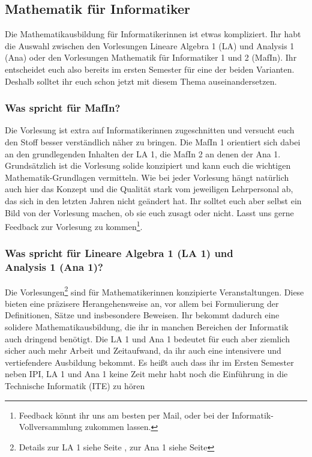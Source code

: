 \subsection{Mathematik für Informatiker}

Die Mathematikausbildung für Informatikerinnen ist etwas kompliziert. Ihr habt die Auswahl zwischen den Vorlesungen Lineare Algebra 1 (\gls{LA}) und Analysis 1 (\gls{Ana}) oder den Vorlesungen Mathematik für Informatiker 1 und 2 (\gls{MafIn}). Ihr entscheidet euch also bereits im ersten Semester für eine der beiden Varianten. Deshalb solltet ihr euch schon jetzt mit diesem Thema auseinandersetzen.

\subsubsection{Was spricht für MafIn?}
Die Vorlesung ist extra auf Informatikerinnen zugeschnitten und versucht euch den Stoff besser verständlich näher zu bringen. Die MafIn 1 orientiert sich dabei an den grundlegenden Inhalten der LA 1, die MafIn 2 an denen der Ana 1. Grundsätzlich ist die Vorlesung solide konzipiert und kann euch die wichtigen Mathematik-Grundlagen vermitteln. Wie bei jeder Vorlesung hängt natürlich auch hier das Konzept und die Qualität stark vom jeweiligen Lehrpersonal ab, das sich in den letzten Jahren nicht geändert hat. Ihr solltet euch aber selbst ein Bild von der Vorlesung machen, ob sie euch zusagt oder nicht. Lasst uns gerne Feedback zur Vorlesung zu kommen\footnote{Feedback könnt ihr uns am besten per Mail, oder bei der Informatik-Vollversammlung zukommen lassen.}.

\subsubsection{Was spricht für Lineare Algebra 1 (LA 1) und \\Analysis 1 (Ana 1)?}
Die Vorlesungen\footnote{Details zur LA 1 siehe Seite \pageref{la1}, zur Ana 1 siehe Seite \pageref{ana1}} sind für Mathematikerinnen konzipierte Veranstaltungen. Diese bieten eine präzisere Herangehensweise an, vor allem bei Formulierung der Definitionen, Sätze und insbesondere Beweisen. Ihr bekommt dadurch eine solidere Mathematikausbildung, die ihr in manchen Bereichen der Informatik auch dringend benötigt. Die LA 1 und Ana 1 bedeutet für euch aber ziemlich sicher auch mehr Arbeit und Zeitaufwand, da ihr auch eine intensivere und vertiefendere Ausbildung bekommt. Es heißt auch dass ihr im Ersten Semester neben \gls{IPI}, LA 1 und Ana 1 keine Zeit mehr habt noch die Einführung in die Technische Informatik (\gls{ITE}) zu hören\\


